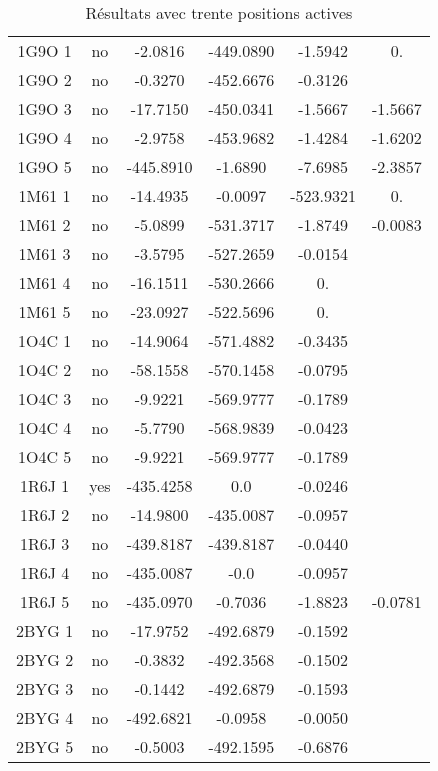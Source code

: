\begin{table}[h]
{\begin{tabular}{cccccc}
        1G9O 1 & no & -2.0816    &    -449.0890 & -1.5942 & 0. \\               
        1G9O 2 & no & -0.3270    &    -452.6676 & -0.3126 & \\          
        1G9O 3 & no & -17.7150   &    -450.0341 & -1.5667 & -1.5667 \\         
        1G9O 4 & no & -2.9758    &    -453.9682 & -1.4284 & -1.6202 \\          
        1G9O 5 & no & -445.8910  &    -1.6890   & -7.6985   & -2.3857 \\          
        1M61 1 & no & -14.4935   &    -0.0097   & -523.9321 & 0. \\            
        1M61 2 & no & -5.0899    &    -531.3717 & -1.8749 & -0.0083 \\         
        1M61 3 & no & -3.5795    &    -527.2659 & -0.0154 & \\           
        1M61 4 & no & -16.1511   &    -530.2666 & 0. & \\              
        1M61 5 & no & -23.0927   &    -522.5696 & 0. & \\                 
        1O4C 1 & no & -14.9064   &    -571.4882 & -0.3435 & \\         
        1O4C 2 & no & -58.1558   &    -570.1458 & -0.0795 & \\         
        1O4C 3 & no & -9.9221    &    -569.9777 & -0.1789 & \\          
        1O4C 4 & no & -5.7790    &    -568.9839 & -0.0423 & \\          
        1O4C 5 & no & -9.9221    &    -569.9777 & -0.1789 & \\          
        1R6J 1 & yes& -435.4258  &     0.0      & -0.0246 & \\               
        1R6J 2 & no & -14.9800   &    -435.0087 & -0.0957 & \\         
        1R6J 3 & no & -439.8187  &    -439.8187 & -0.0440 & \\               
        1R6J 4 & no &  -435.0087  &    -0.0     & -0.0957 & \\               
        1R6J 5 & no & -435.0970  &    -0.7036   & -1.8823 & -0.0781 \\          
        2BYG 1 & no & -17.9752   &    -492.6879 & -0.1592 & \\         
        2BYG 2 & no & -0.3832    &    -492.3568 & -0.1502 & \\          
        2BYG 3 & no & -0.1442    &    -492.6879 & -0.1593 & \\          
        2BYG 4 & no & -492.6821 &    -0.0958    & -0.0050 & \\          
        2BYG 5 & no & -0.5003    &   -492.1595  & -0.6876 & \\           
       \bottomrule


 \end{tabular}  
}
 \caption{Résultats  avec trente positions actives }    
\label{tab:result_30_actives}      
\end{table}
 
